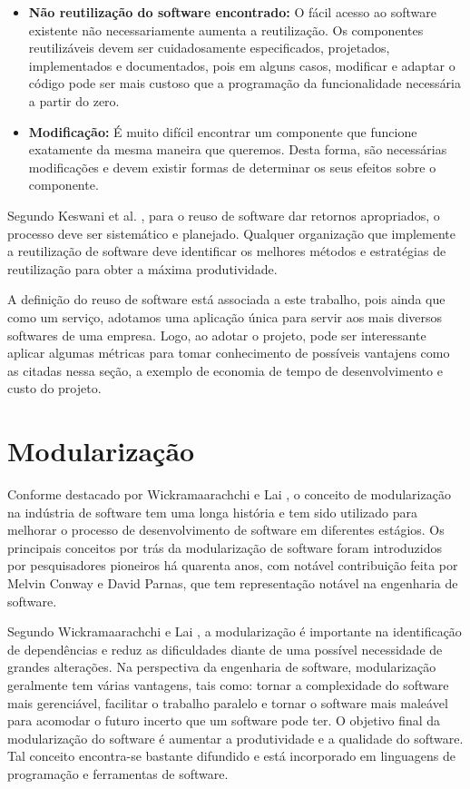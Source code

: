 \begin{itemize}
\item \textbf{Não reutilização do software encontrado:} O fácil acesso ao software existente
não necessariamente aumenta a reutilização. Os componentes reutilizáveis devem ser cuidadosamente especificados, projetados, implementados e documentados, pois em alguns casos, modificar e adaptar o código  pode ser mais custoso que a programação da funcionalidade necessária a partir do zero.

\item \textbf{Modificação:} É muito difícil encontrar um componente que funcione
exatamente da mesma maneira que queremos. Desta forma, são necessárias modificações e devem existir formas de determinar os seus efeitos sobre o componente.


\end{itemize}


Segundo Keswani et al. \citep{6783445}, para o reuso de software dar retornos apropriados, o processo deve ser sistemático e planejado. Qualquer organização que implemente a reutilização de software deve identificar os melhores métodos e estratégias de reutilização para obter a máxima produtividade.

A definição do reuso de software está associada a este trabalho, pois ainda que como um serviço, adotamos uma aplicação única para servir aos mais diversos softwares de uma empresa. Logo, ao adotar o projeto, pode ser interessante aplicar algumas métricas para tomar conhecimento de possíveis vantajens como as citadas nessa seção, a exemplo de economia de tempo de desenvolvimento e custo do projeto.


\section{Modularização}\label{sec:modularizacao} %


Conforme destacado por Wickramaarachchi e Lai \citep{7062705}, o conceito de modularização na indústria de software tem uma longa história e tem sido utilizado para melhorar o processo de desenvolvimento de software em diferentes estágios. Os principais conceitos por trás da modularização de software foram introduzidos por pesquisadores pioneiros há quarenta anos, com notável contribuição feita por Melvin Conway e David Parnas, que tem representação notável na engenharia de software.


Segundo Wickramaarachchi e Lai \citep{7062705}, a modularização é importante na identificação de dependências e reduz as dificuldades diante de uma possível necessidade de grandes alterações. Na perspectiva da engenharia de software, modularização geralmente tem várias vantagens, tais como: tornar a complexidade do software mais gerenciável, facilitar o trabalho paralelo e tornar o software mais maleável para acomodar o futuro incerto que um software pode ter. O objetivo final da modularização do software é aumentar a produtividade e a qualidade do software. Tal conceito encontra-se bastante difundido e está incorporado em linguagens de programação e ferramentas de software.

